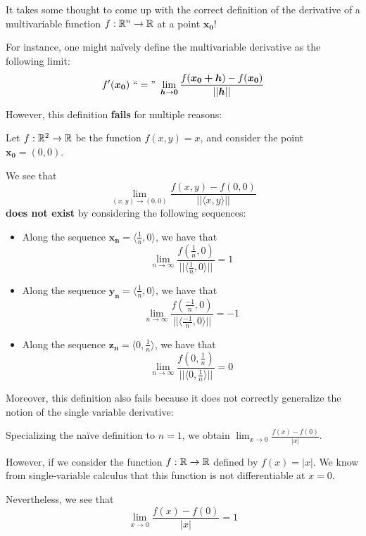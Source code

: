 It takes some thought to come up with the correct definition of the derivative of a multivariable function $f : \mathbb{R}^n \to \mathbb{R}$ at a point $\bm{x_0}$!  

For instance, one might na\"ively define the multivariable derivative as the following limit:
$$f'(\bm{x_0}) \ ``=" \ \lim_{\bm{h} \to \bm{0}} \frac{f(\bm{x_0+h})-f(\bm{x_0})}{||\bm{h}||}$$

However, this definition \textbf{fails} for multiple reasons:

\begin{example}\label{derivfail1}
    Let $f : \mathbb{R}^2 \to \mathbb{R}$ be the function $f(x,y) = x$, and consider the point $\bm{x_0} = (0,0)$.  
    
    We see that $$\lim_{(x,y) \to (0,0) } \frac{f(x,y)-f(0,0)}{||\langle x,y\rangle||}$$
    \textbf{does not exist} by considering the following sequences:

    \begin{itemize}
        \item Along the sequence $\bm{x_n} = \langle \frac{1}{n}, 0 \rangle$, we have that $$\lim_{n\to\infty} \frac{f(\frac{1}{n}, 0)}{||\langle \frac{1}{n}, 0\rangle||} = 1$$
        \item Along the sequence $\bm{y_n} = \langle \frac{1}{n}, 0 \rangle$, we have that $$\lim_{n\to\infty} \frac{f(\frac{-1}{n}, 0)}{||\langle \frac{-1}{n}, 0\rangle||} = -1$$
        \item Along the sequence $\bm{z_n} = \langle 0, \frac{1}{n}\rangle$, we have that $$\lim_{n\to\infty} \frac{f(0, \frac{1}{n})}{||\langle 0, \frac{1}{n}\rangle||} = 0$$
    \end{itemize}
    
\end{example}

Moreover, this definition also fails because it does not correctly generalize the notion of the single variable derivative:

\begin{example}\label{derivfail2}
    Specializing the na\"ive definition to $n=1$, we obtain $\lim_{x \to 0 } \frac{f(x)-f(0)}{|x|}$.

    However, if we consider the function $f: \mathbb{R} \to \mathbb{R}$ defined by $f(x) = |x|$.  We know from single-variable calculus that this function is not differentiable at $x=0$.

    Nevertheless, we see that $$\lim_{x \to 0 } \frac{f(x)-f(0)}{|x|} = 1$$
    
\end{example}

